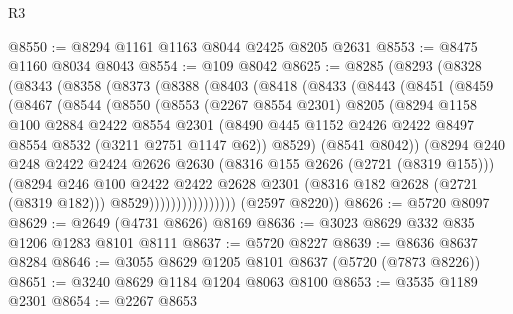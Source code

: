 \begin{lexlean}{R3}
\begin{coremodule}
@8550 := @8294 @1161 @1163 @8044 @2425 @8205 @2631
@8553 := @8475 @1160 @8034 @8043
@8554 := @109 @8042
@8625 := @8285
    (@8293
      (@8328
        (@8343
          (@8358
            (@8373
              (@8388
                (@8403
                  (@8418
                    (@8433
                      (@8443
                        (@8451
                          (@8459
                            (@8467
                              (@8544
                                (@8550
                                  (@8553
                                    (@2267 @8554 @2301)
                                    @8205
                                    (@8294
                                      @1158
                                      @100
                                      @2884
                                      @2422
                                      @8554
                                      @2301
                                      (@8490
                                        @445
                                        @1152
                                        @2426
                                        @2422
                                        @8497
                                        @8554
                                        @8532
                                        (@3211 @2751 @1147 @62))
                                      @8529)
                                    (@8541 @8042))
                                  (@8294
                                    @240
                                    @248
                                    @2422
                                    @2424
                                    @2626
                                    @2630
                                    (@8316 @155 @2626 (@2721 (@8319 @155)))
                                    (@8294
                                      @246
                                      @100
                                      @2422
                                      @2422
                                      @2628
                                      @2301
                                      (@8316 @182 @2628 (@2721 (@8319 @182)))
                                      @8529))))))))))))))))
      (@2597 @8220))
@8626 := @5720 @8097
@8629 := @2649 (@4731 @8626) @8169
@8636 := @3023 @8629 @332 @835 @1206 @1283 @8101 @8111
@8637 := @5720 @8227
@8639 := @8636 @8637 @8284
@8646 := @3055 @8629 @1205 @8101 @8637 (@5720 (@7873 @8226))
@8651 := @3240 @8629 @1184 @1204 @8063 @8100
@8653 := @3535 @1189 @2301
@8654 := @2267 @8653

\end{coremodule}
\end{lexlean}
